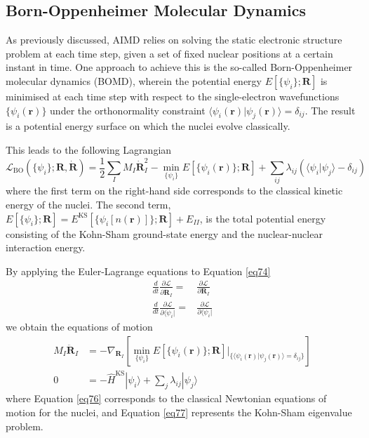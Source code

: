 \subsection{Born-Oppenheimer Molecular Dynamics}
As previously discussed, AIMD relies on solving the static electronic structure 
problem at each time step, given a set of fixed nuclear positions at a certain instant in time.
One approach to achieve this is the so-called Born-Oppenheimer molecular dynamics 
(BOMD)\supercite{Kuhne2014}, wherein the potential energy $E[\{\psi_{i}\}; \mathbf{R}]$ 
is minimised at each time step with respect to the single-electron wavefunctions
$\{\psi_{i}(\mathbf{r})\}$ under the orthonormality constraint 
$\langle \psi_i(\mathbf{r}) | \psi_j(\mathbf{r}) \rangle = \delta_{ij}$. 
The result is a potential energy surface on which the nuclei evolve classically.

This leads to the following Lagrangian
\begin{equation}
    \label{eq74}
    \mathcal{L}_{\text{BO}}(\{\psi_{i}\}; \mathbf{R}, \dot{\mathbf{R}}) =
    \frac{1}{2}\sum_{I} M_{I} \dot{\mathbf{R}}_{I}^2 - \min_{\{\psi_{i}\}} E[\{\psi_{i}(\mathbf{r})\}; \mathbf{R}]
    + \sum_{ij} \lambda_{ij} \left( \langle \psi_i | \psi_j \rangle - \delta_{ij} \right)
\end{equation}
where the first term on the right-hand side corresponds to the classical kinetic energy of the nuclei. The second term,
$E[\{\psi_{i}\}; \mathbf{R}] = E^{\text{KS}}[\{\psi_{i}[n(\mathbf{r})]\}; \mathbf{R}] + E_{II}$, is the total potential energy consisting of the Kohn-Sham ground-state energy and the nuclear-nuclear interaction energy.

By applying the Euler-Lagrange equations to Equation \ref{eq74}
\begin{equation}
    \label{eq75}
\begin{aligned}
    \frac{d}{dt}\frac{\partial \mathcal{L}}{\partial \dot{\mathbf{R}}_{I}} =& \frac{\partial \mathcal{L}}{\partial \mathbf{R}_{I}} \\
    \frac{d}{dt}\frac{\partial \mathcal{L}}{\partial \langle\dot{\psi}_{i}|} =& \frac{\partial \mathcal{L}}{\partial \langle\psi_{i}|}
\end{aligned}
\end{equation}
we obtain the equations of motion 
    \begin{align}
        M_{I}\ddot{\mathbf{R}}_{I} &= -\nabla_{\mathbf{R}_{I}} \left[\min_{\{\psi_{i}\}} E[\{\psi_{i}(\mathbf{r})\}; \mathbf{R}]\bigg|_{\{\langle \psi_i(\mathbf{r}) | \psi_j(\mathbf{r}) \rangle = \delta_{ij}\}} \right]\label{eq76} \\
        0 &= -\hat{H}^{\text{KS}}|\psi_{i}\rangle  + \sum_{j} \lambda_{ij} | \psi_j \rangle \label{eq77}
    \end{align}
where Equation \ref{eq76} corresponds to the classical Newtonian equations of motion for the nuclei, and Equation \ref{eq77} represents the Kohn-Sham eigenvalue problem.  

